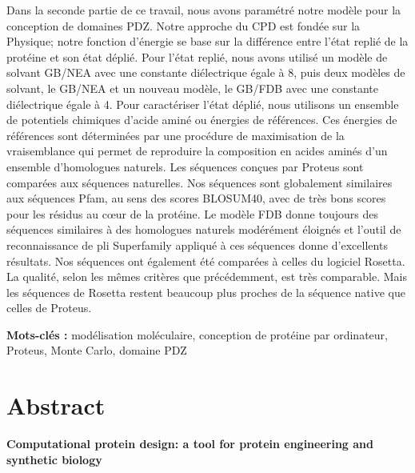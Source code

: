 Dans la seconde partie de ce travail, nous avons paramétré notre modèle pour la conception de domaines PDZ. Notre approche du CPD est fondée sur la Physique; notre fonction d’énergie se base sur la différence entre l’état replié de la protéine et son état déplié. Pour l’état replié, nous avons utilisé un modèle de solvant GB/NEA avec une constante diélectrique égale à 8, puis  deux modèles de solvant, le GB/NEA et un nouveau modèle, le GB/FDB avec une constante diélectrique égale à 4. Pour caractériser l’état déplié, nous utilisons un ensemble de potentiels chimiques d’acide aminé ou énergies de références. Ces énergies de références sont déterminées par une procédure de maximisation de la vraisemblance qui permet de reproduire la composition en acides aminés d’un ensemble d’homologues naturels. Les séquences conçues par Proteus sont comparées aux séquences naturelles. Nos séquences sont globalement similaires aux séquences Pfam, au sens des scores BLOSUM40, avec de très bons scores pour les résidus au cœur de la protéine. Le modèle FDB donne toujours des séquences similaires à des homologues naturels modérément éloignés et l’outil de reconnaissance de pli Superfamily appliqué à ces séquences donne d’excellents résultats. Nos séquences ont également été comparées à celles du logiciel Rosetta. La qualité, selon les mêmes critères que précédemment, est très comparable. Mais les séquences de Rosetta restent beaucoup plus proches de la séquence native que celles de Proteus.   


\bigskip

\textbf{Mots-clés :} modélisation moléculaire, conception de protéine par ordinateur, Proteus, Monte Carlo, domaine PDZ

\vfill




\section*{Abstract}

{\large\bf\noindent Computational protein design: a tool for protein engineering and synthetic biology}

\bigskip

